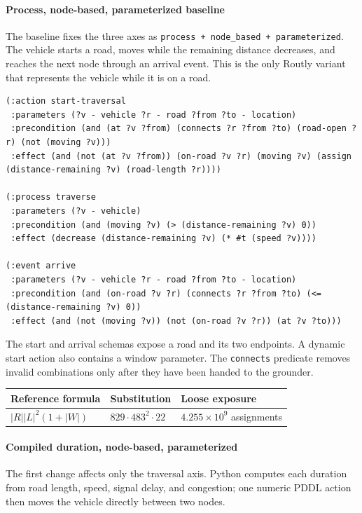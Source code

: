 \documentclass[10pt]{article}
\begin{document}
\paragraph{Process, node-based, parameterized baseline}
The baseline fixes the three axes as
\texttt{process + node\_based + parameterized}. The vehicle starts a road,
moves while the remaining distance decreases, and reaches the next node through
an arrival event. This is the only Routly variant that represents the vehicle
while it is on a road.
\vspace{0.5em}

\begin{lstlisting}
(:action start-traversal
 :parameters (?v - vehicle ?r - road ?from ?to - location)
 :precondition (and (at ?v ?from) (connects ?r ?from ?to) (road-open ?r) (not (moving ?v)))
 :effect (and (not (at ?v ?from)) (on-road ?v ?r) (moving ?v) (assign (distance-remaining ?v) (road-length ?r))))

(:process traverse
 :parameters (?v - vehicle)
 :precondition (and (moving ?v) (> (distance-remaining ?v) 0))
 :effect (decrease (distance-remaining ?v) (* #t (speed ?v))))

(:event arrive
 :parameters (?v - vehicle ?r - road ?from ?to - location)
 :precondition (and (on-road ?v ?r) (connects ?r ?from ?to) (<= (distance-remaining ?v) 0))
 :effect (and (not (moving ?v)) (not (on-road ?v ?r)) (at ?v ?to)))
\end{lstlisting}

The start and arrival schemas expose a road and its two endpoints. A dynamic
start action also contains a window parameter. The \texttt{connects} predicate
removes invalid combinations only after they have been handed to the grounder.

\begin{center}
\scriptsize
\begin{tabular}{@{}lll@{}}
\toprule
Reference formula & Substitution & Loose exposure \\
\midrule
$|R||L|^2(1+|W|)$
& $829\cdot483^2\cdot22$
& $4.255\times10^9$ assignments \\
\bottomrule
\end{tabular}
\end{center}

\paragraph{Compiled duration, node-based, parameterized}
The first change affects only the traversal axis. Python
computes each duration from road length, speed, signal delay, and congestion;
one numeric PDDL action then moves the vehicle directly between two nodes.
\end{document}
